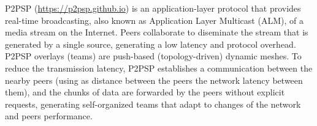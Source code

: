 P2PSP (\url{https://p2psp.github.io}) is an application-layer protocol
that provides real-time broadcasting, also known as Application Layer
Multicast (ALM), of a media stream on the Internet. Peers collaborate
to diseminate the stream that is generated by a single source,
generating a low latency and protocol overhead. P2PSP overlays (teams)
are push-based (topology-driven) dynamic meshes. To reduce the
transmission latency, P2PSP establishes a communication between the
nearby peers (using as distance between the peers the network latency
between them), and the chunks of data are forwarded by the peers
without explicit requests, generating self-organized teams that adapt
to changes of the network and peers performance.
